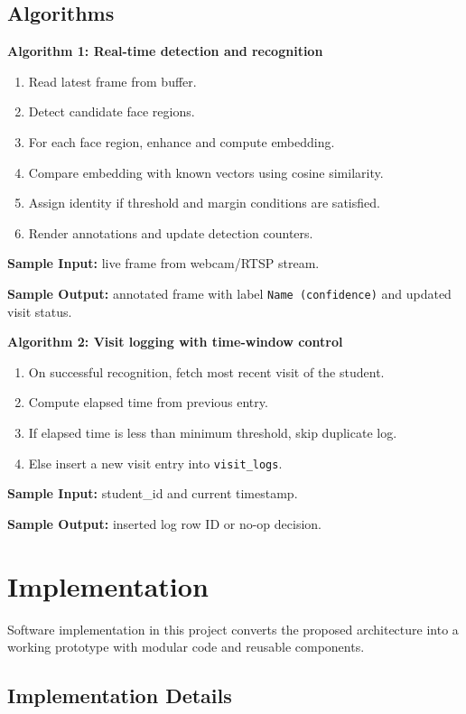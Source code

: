 \documentclass{fisatprojectfinal}
\begin{document}
\section{Algorithms}
\textbf{Algorithm 1: Real-time detection and recognition}
\begin{enumerate}
	\item Read latest frame from buffer.
	\item Detect candidate face regions.
	\item For each face region, enhance and compute embedding.
	\item Compare embedding with known vectors using cosine similarity.
	\item Assign identity if threshold and margin conditions are satisfied.
	\item Render annotations and update detection counters.
\end{enumerate}

\textbf{Sample Input:} live frame from webcam/RTSP stream.

\textbf{Sample Output:} annotated frame with label \texttt{Name (confidence)} and updated visit status.

\textbf{Algorithm 2: Visit logging with time-window control}
\begin{enumerate}
	\item On successful recognition, fetch most recent visit of the student.
	\item Compute elapsed time from previous entry.
	\item If elapsed time is less than minimum threshold, skip duplicate log.
	\item Else insert a new visit entry into \texttt{visit\_logs}.
\end{enumerate}

\textbf{Sample Input:} student\_id and current timestamp.

\textbf{Sample Output:} inserted log row ID or no-op decision.

\chapter{Implementation}
Software implementation in this project converts the proposed architecture into a working prototype with modular code and reusable components.

\section{Implementation Details}
\end{document}
